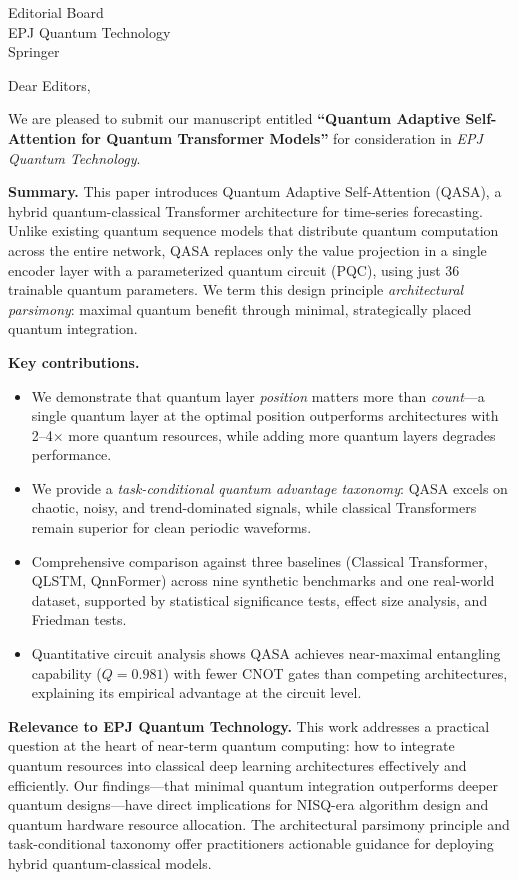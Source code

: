 \documentclass[11pt]{letter}
\begin{document}
\begin{letter}{Editorial Board \\ EPJ Quantum Technology \\ Springer}

\opening{Dear Editors,}

We are pleased to submit our manuscript entitled \textbf{``Quantum Adaptive Self-Attention for Quantum Transformer Models''} for consideration in \textit{EPJ Quantum Technology}.

\textbf{Summary.}
This paper introduces Quantum Adaptive Self-Attention (QASA), a hybrid quantum-classical Transformer architecture for time-series forecasting. Unlike existing quantum sequence models that distribute quantum computation across the entire network, QASA replaces only the value projection in a single encoder layer with a parameterized quantum circuit (PQC), using just 36 trainable quantum parameters. We term this design principle \emph{architectural parsimony}: maximal quantum benefit through minimal, strategically placed quantum integration.

\textbf{Key contributions.}
\begin{itemize}
    \item We demonstrate that quantum layer \emph{position} matters more than \emph{count}---a single quantum layer at the optimal position outperforms architectures with 2--4$\times$ more quantum resources, while adding more quantum layers degrades performance.
    \item We provide a \emph{task-conditional quantum advantage taxonomy}: QASA excels on chaotic, noisy, and trend-dominated signals, while classical Transformers remain superior for clean periodic waveforms.
    \item Comprehensive comparison against three baselines (Classical Transformer, QLSTM, QnnFormer) across nine synthetic benchmarks and one real-world dataset, supported by statistical significance tests, effect size analysis, and Friedman tests.
    \item Quantitative circuit analysis shows QASA achieves near-maximal entangling capability ($Q = 0.981$) with fewer CNOT gates than competing architectures, explaining its empirical advantage at the circuit level.
\end{itemize}

\textbf{Relevance to EPJ Quantum Technology.}
This work addresses a practical question at the heart of near-term quantum computing: how to integrate quantum resources into classical deep learning architectures effectively and efficiently. Our findings---that minimal quantum integration outperforms deeper quantum designs---have direct implications for NISQ-era algorithm design and quantum hardware resource allocation. The architectural parsimony principle and task-conditional taxonomy offer practitioners actionable guidance for deploying hybrid quantum-classical models.


\end{letter}
\end{document}
